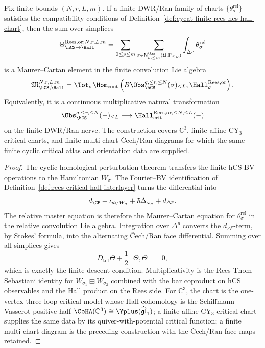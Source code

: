 \begin{proposition}
\label{prop:cycat-finite-dwr-ran-rees-hcs-hall}
Fix finite bounds $(N,r,L,m)$. If a finite DWR/Ran family of charts
\(\{\theta_\sigma^{\mathrm{rel}}\}\) satisfies the compatibility
conditions of Definition~\ref{def:cycat-finite-rees-hcs-hall-chart},
then the sum over simplices
\[
 \Theta_{\hCS\to\Hall}^{\mathrm{Rees},\mathrm{or};N,r,L,m}
 =
 \sum_{0\leq p\leq m}
 \sum_{\sigma\in
 \mathsf N^{\Ran}_{p,\leq m}(\mathfrak U;\Gamma_{\leq L})}
 \int_{\Delta^p}\theta_\sigma^{\mathrm{rel}}
\]
is a Maurer--Cartan element in the finite convolution Lie algebra
\[
 \mathfrak M_{\hCS,\Hall}^{N,r,L,m}
 =
 \Tot_{\sigma}
 \Hom_{\mathrm{cont}}
 \left(
 B\Obs_{\hCS}^{q,\leq r,\leq N}(\sigma)_{\leq L},
 \Hall_{\sigma}^{\mathrm{Rees},\mathrm{or}}
 \right).
\]
Equivalently, it is a continuous multiplicative natural transformation
\[
 \Obs_{\hCS}^{q,\leq r,\leq N}(-)_{\leq L}
 \longrightarrow
 \Hall_{\mathrm{crit}}^{\mathrm{Rees},\mathrm{or},\leq N,\leq L}(-)
\]
on the finite DWR/Ran nerve. The construction covers
\(\mathbb C^3\), finite affine CY$_3$ critical charts, and finite
multi-chart \v{C}ech/Ran diagrams for which the same finite cyclic
critical atlas and orientation data are supplied.
\end{proposition}

\begin{proof}
The cyclic homological perturbation theorem transfers the finite hCS BV
operations to the Hamiltonian \(W_\sigma\). The Fourier--BV
identification of Definition~\ref{def:rees-critical-hall-interlayer}
turns the differential into
\[
 d_{\CE}+\iota_{d_VW_\sigma}+\hbar\Delta_{\omega_\sigma}+d_{\Delta^p}.
\]
The relative master equation is therefore the Maurer--Cartan equation
for \(\theta_\sigma^{\mathrm{rel}}\) in the relative convolution Lie
algebra. Integration over \(\Delta^p\) converts the
\(d_{\Delta^p}\)-term, by Stokes' formula, into the alternating
\v{C}ech/Ran face differential. Summing over all simplices gives
\[
 D_{\mathrm{tot}}\Theta
 +\frac{1}{2}[\Theta,\Theta]=0,
\]
which is exactly the finite descent condition. Multiplicativity is the
Rees Thom--Sebastiani identity for \(W_{\sigma_1}\boxplus W_{\sigma_2}\)
combined with the bar coproduct on hCS observables and the Hall product
on the Rees side. For \(\mathbb C^3\), the chart is the one-vertex
three-loop critical model whose Hall cohomology is the
Schiffmann--Vasserot positive half
\(\CoHA(\mathbb C^3)\cong \Yplus(\widehat{\mathfrak{gl}}_1)\); a finite
affine CY$_3$ critical chart supplies the same data by its
quiver-with-potential critical function; a finite multi-chart diagram
is the preceding construction with the \v{C}ech/Ran face maps retained.
\end{proof}


